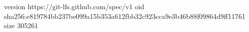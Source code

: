 version https://git-lfs.github.com/spec/v1
oid sha256:e819784bb237be099a15b353a612fbb32c923cca9e3b46b88f09864d9ff11761
size 305261
